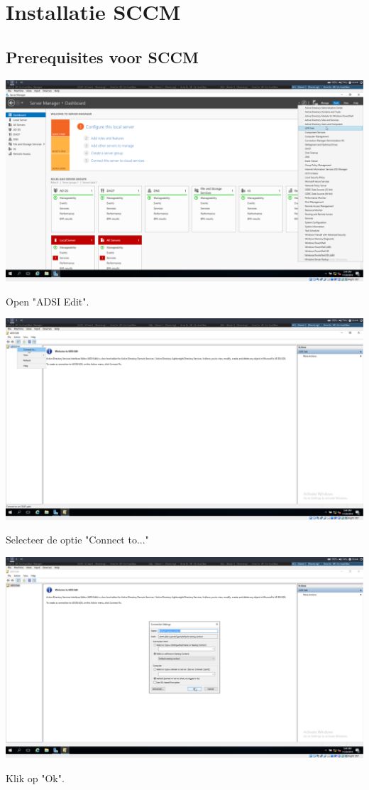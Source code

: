 \documentclass[a4paper]{article}
\begin{document}
\clearpage



\section{Installatie SCCM}
\subsection{Prerequisites voor SCCM}
\begin{center}
	\includegraphics[width=15cm]{Pictures/SCCM/1/1543499067.png}
	
	Open "ADSI Edit".
\end{center}
\begin{center}
	\includegraphics[width=15cm]{Pictures/SCCM/1/1543499073.png}
	
	Selecteer de optie "Connect to..."
\end{center}
\begin{center}
	\includegraphics[width=15cm]{Pictures/SCCM/1/1543499076.png}
	
	Klik op "Ok".
\end{center}
\end{document}
